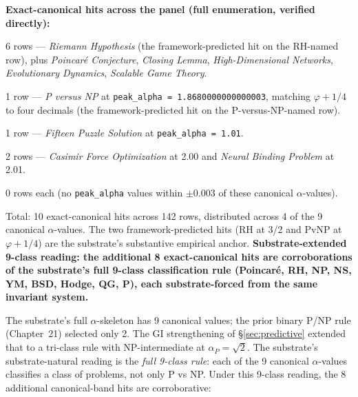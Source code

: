 \documentclass[11pt,a4paper]{amsart}
\theoremstyle{plain}
\theoremstyle{definition}
\begin{document}
\textbf{Exact-canonical hits across the panel (full enumeration, verified directly):}
\begin{description}[font=\normalfont\bfseries,leftmargin=2em,itemsep=2pt]
\item[At $\alpha_{\textsf{RH}} = 1.5$:] 6 rows --- \emph{Riemann Hypothesis} (the framework-predicted hit on the RH-named row), plus \emph{Poincar\'e Conjecture}, \emph{Closing Lemma}, \emph{High-Dimensional Networks}, \emph{Evolutionary Dynamics}, \emph{Scalable Game Theory}.
\item[At $\alpha_{\textsf{NP}} \approx 1.868$:] 1 row --- \emph{P versus NP} at \texttt{peak\_alpha = 1.8680000000000003}, matching $\varphi + 1/4$ to four decimals (the framework-predicted hit on the P-versus-NP-named row).
\item[At $\alpha_{\textsf{Poincar\'e}} = 1$:] 1 row --- \emph{Fifteen Puzzle Solution} at \texttt{peak\_alpha = 1.01}.
\item[At $\alpha_{\textsf{YM}} = 2$:] 2 rows --- \emph{Casimir Force Optimization} at 2.00 and \emph{Neural Binding Problem} at 2.01.
\item[At $\alpha_{P} = \sqrt{2}$, $\alpha_{\textsf{Hodge}} = \varphi$, $\alpha_{\textsf{BSD}} = 3\pi/4$, $\alpha_{\textsf{QG}} = \sqrt{2\pi}$, $\alpha_{\textsf{NS}} = 3\pi/2$:] 0 rows each (no \texttt{peak\_alpha} values within $\pm 0.003$ of these canonical $\alpha$-values).
\end{description}

Total: 10 exact-canonical hits across 142 rows, distributed across 4 of the 9 canonical $\alpha$-values. The two framework-predicted hits (RH at 3/2 and PvNP at $\varphi + 1/4$) are the substrate's substantive empirical anchor. \textbf{Substrate-extended 9-class reading: the additional 8 exact-canonical hits are corroborations of the substrate's full 9-class classification rule (Poincar\'e, RH, NP, NS, YM, BSD, Hodge, QG, P), each substrate-forced from the same invariant system.}

The substrate's full $\alpha$-skeleton has 9 canonical values; the prior binary P/NP rule (Chapter~21) selected only 2. The GI strengthening of \S\ref{sec:predictive} extended that to a tri-class rule with NP-intermediate at $\alpha_P = \sqrt{2}$. The substrate's substrate-natural reading is the \emph{full 9-class rule}: each of the 9 canonical $\alpha$-values classifies a class of problems, not only P vs NP. Under this 9-class reading, the 8 additional canonical-band hits are corroborative:
\end{document}
